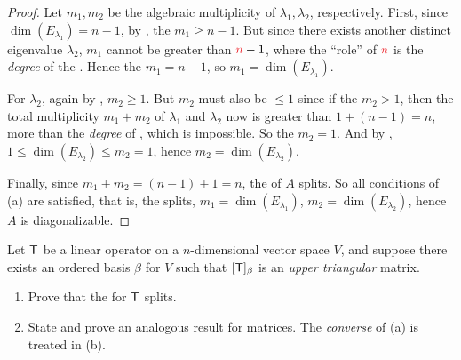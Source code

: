 \begin{proof}
Let \(m_1, m_2\) be the algebraic multiplicity of \(\lambda_1, \lambda_2\), respectively.
First, since \(\dim(E_{\lambda_1}) = n - 1\), by , the \(m_1 \ge n - 1\).
But since there exists another distinct eigenvalue \(\lambda_2\), \(m_1\) cannot be greater than \(\RED{n} - 1\), where the ``role'' of \(\RED{n}\) is the \emph{degree} of the \CPOLY{}.
Hence the \(m_1 = n - 1\), so \(m_1 = \dim(E_{\lambda_1})\).

For \(\lambda_2\), again by , \(m_2 \ge 1\).
But \(m_2\) must also be \(\le 1\) since if the \(m_2 > 1\), then the total multiplicity \(m_1 + m_2\) of \(\lambda_1\) and \(\lambda_2\) now is greater than \(1 + (n - 1) = n\), more than the \emph{degree} of \CPOLY{}, which is impossible.
So the \(m_2 = 1\).
And by , \(1 \le \dim(E_{\lambda_2}) \le m_2 = 1\), hence  \(m_2 = \dim(E_{\lambda_2})\).

Finally, since \(m_1 + m_2 = (n - 1) + 1 = n\), the \CPOLY{} of \(A\) splits.
So all conditions of (a) are satisfied, that is, the \CPOLY{} splits, \(m_1 = \dim(E_{\lambda_1})\), \(m_2 = \dim(E_{\lambda_2})\), hence \(A\) is diagonalizable.
\end{proof}

\begin{exercise} \label{exercise 5.2.9}
Let \(\textsf{T}\) be a linear operator on a \(n\)-dimensional vector space \(V\), and suppose there exists an ordered basis \(\beta\) for \(V\) such that \([\textsf{T}]_{\beta}\) is an \emph{upper triangular} matrix.
\begin{enumerate}
\item Prove that the \CPOLY{} for \(\textsf{T}\) splits.
\item State and prove an analogous result for matrices.
The \emph{converse} of (a) is treated in (b).
\end{enumerate}
\end{exercise}

